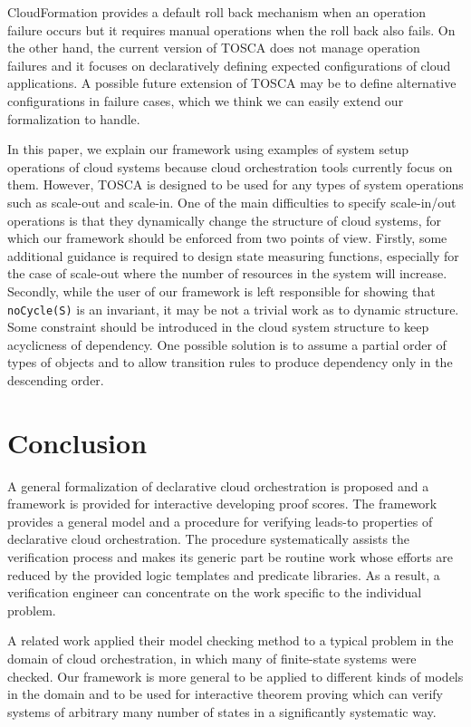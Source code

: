 \documentclass[12pt]{report}
\newcommand{\stt}[1]{{\small{\tt {#1}}}}
\begin{document}
CloudFormation provides a default roll back mechanism when an
operation failure occurs but it requires manual operations when the
roll back also fails. On the other hand, the current version of TOSCA
does not manage operation failures and it focuses on declaratively
defining expected configurations of cloud applications. A possible
future extension of TOSCA may be to define alternative configurations
in failure cases, which we think we can easily extend our
formalization to handle.

In this paper, we explain our framework using examples of system setup
operations of cloud systems because cloud orchestration tools
currently focus on them. However, TOSCA is designed to be used for any
types of system operations such as scale-out and scale-in. One of the
main difficulties to specify scale-in/out operations is that they
dynamically change the structure of cloud systems, for which our
framework should be enforced from two points of view. Firstly, some
additional guidance is required to design state measuring functions,
especially for the case of scale-out where the number of resources in
the system will increase. Secondly, while the user of our framework is
left responsible for showing that \stt{noCycle(S)} is an invariant, it
may be not a trivial work as to dynamic structure. Some constraint
should be introduced in the cloud system structure to keep acyclicness
of dependency. One possible solution is to assume a partial order of
types of objects and to allow transition rules to produce dependency only
in the descending order.

\section{Conclusion}
A general formalization of declarative cloud orchestration is proposed
and a framework is provided for interactive developing proof
scores. The framework provides a general model and a procedure for
verifying leads-to properties of declarative cloud orchestration.  The
procedure systematically assists the verification process and makes
its generic part be routine work whose efforts are reduced by the
provided logic templates and predicate libraries. As a result, a
verification engineer can concentrate on the work specific to the
individual problem.

A related work applied their model checking method to a typical
problem in the domain of cloud orchestration, in which many of
finite-state systems were checked. Our framework is more general to be
applied to different kinds of models in the domain and to be used for
interactive theorem proving which can verify systems of arbitrary many
number of states in a significantly systematic way.
\end{document}
